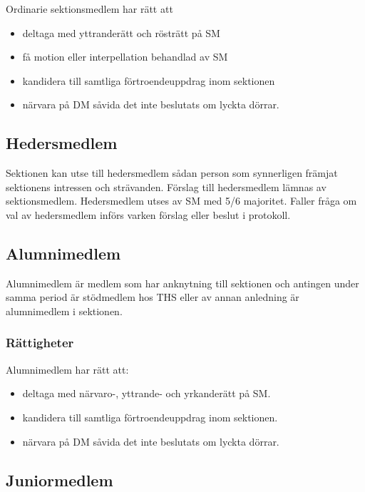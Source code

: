 \documentclass{dgovdoc}
\begin{document}
Ordinarie sektionsmedlem har rätt att

\begin{itemize}
  \item deltaga med yttranderätt och rösträtt på SM
  \item få motion eller interpellation behandlad av SM
  \item kandidera till samtliga förtroendeuppdrag inom sektionen
  \item närvara på DM såvida det inte beslutats om lyckta dörrar.
\end{itemize}

\subsection{Hedersmedlem}
\label{sec:hedersmedlem}

Sektionen kan utse till hedersmedlem sådan person som synnerligen främjat
sektionens intressen och strävanden. Förslag till hedersmedlem lämnas av
sektionsmedlem. Hedersmedlem utses av SM med 5/6 majoritet. Faller fråga om val
av hedersmedlem införs varken förslag eller beslut i protokoll.

\subsection{Alumnimedlem}
\label{sec:alumnimedlem}

Alumnimedlem är medlem som har anknytning till sektionen och antingen under
samma period är stödmedlem hos THS eller av annan anledning är alumnimedlem i
sektionen.

\subsubsection{Rättigheter}

Alumnimedlem har rätt att:

\begin{itemize}
\item deltaga med närvaro-, yttrande- och yrkanderätt på SM.
\item kandidera till samtliga förtroendeuppdrag inom sektionen.
\item närvara på DM såvida det inte beslutats om lyckta dörrar.
\end{itemize}

\subsection{Juniormedlem}
\label{sec:juniormedlem}
\end{document}
